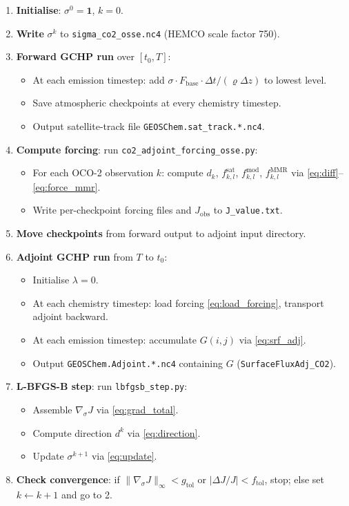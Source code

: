 \documentclass[12pt]{article}
\newcommand{\mmr}{\mathrm{MMR}}
\begin{document}
\begin{enumerate}
  \item \textbf{Initialise}: $\sigma^0 = \mathbf{1}$, $k = 0$.
  \item \textbf{Write} $\sigma^k$ to \texttt{sigma\_co2\_osse.nc4} (HEMCO scale factor 750).
  \item \textbf{Forward GCHP run} over $[t_0, T]$:
    \begin{itemize}
      \item At each emission timestep: add $\sigma \cdot F_{\mathrm{base}} \cdot \Delta t / (\varrho \Delta z)$ to lowest level.
      \item Save atmospheric checkpoints at every chemistry timestep.
      \item Output satellite-track file \texttt{GEOSChem.sat\_track.*.nc4}.
    \end{itemize}
  \item \textbf{Compute forcing}: run \texttt{co2\_adjoint\_forcing\_osse.py}:
    \begin{itemize}
      \item For each OCO-2 observation $k$: compute $d_k$, $f_{k,l}^{\mathrm{sat}}$,
            $f_{k,l}^{\mathrm{mod}}$, $f_{k,l}^{\mmr}$ via \eqref{eq:diff}--\eqref{eq:force_mmr}.
      \item Write per-checkpoint forcing files and $J_{\mathrm{obs}}$ to \texttt{J\_value.txt}.
    \end{itemize}
  \item \textbf{Move checkpoints} from forward output to adjoint input directory.
  \item \textbf{Adjoint GCHP run} from $T$ to $t_0$:
    \begin{itemize}
      \item Initialise $\lambda = 0$.
      \item At each chemistry timestep: load forcing \eqref{eq:load_forcing}, transport adjoint backward.
      \item At each emission timestep: accumulate $G(i,j)$ via \eqref{eq:srf_adj}.
      \item Output \texttt{GEOSChem.Adjoint.*.nc4} containing $G$ (\texttt{SurfaceFluxAdj\_CO2}).
    \end{itemize}
  \item \textbf{L-BFGS-B step}: run \texttt{lbfgsb\_step.py}:
    \begin{itemize}
      \item Assemble $\nabla_\sigma J$ via \eqref{eq:grad_total}.
      \item Compute direction $d^k$ via \eqref{eq:direction}.
      \item Update $\sigma^{k+1}$ via \eqref{eq:update}.
    \end{itemize}
  \item \textbf{Check convergence}: if $\|\nabla_\sigma J\|_\infty < g_{\mathrm{tol}}$
        or $|\Delta J / J| < f_{\mathrm{tol}}$, stop; else set $k \leftarrow k+1$ and go to 2.
\end{enumerate}
\end{document}
